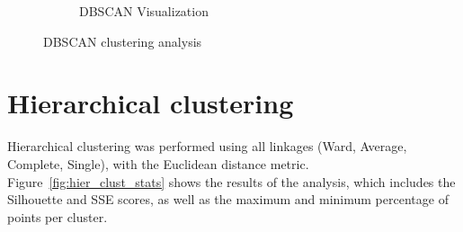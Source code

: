 \begin{figure}[H]
\begin{subfigure}[b]{0.49\textwidth}
        \caption{DBSCAN Visualization}
        \label{fig:DBSCAN_provvisoria}
    \end{subfigure}
    \caption{DBSCAN clustering analysis}
    \label{fig:three_subplots}
\end{figure}




\section{Hierarchical clustering}\label{sec:hierarchical}
Hierarchical clustering was performed using all linkages (Ward, Average, Complete, Single), with the Euclidean distance metric.
Figure~\ref{fig:hier_clust_stats} shows the results of the analysis, which includes the Silhouette and SSE scores, as well as the maximum and minimum percentage of points per cluster.
